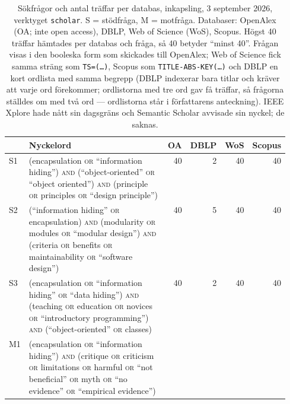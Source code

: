 \begin{table}[!htb]
  \centering
  \caption{Sökfrågor och antal träffar per databas, inkapsling,
    3 september 2026, verktyget \texttt{scholar}.  S = stödfråga, M =
    motfråga.  Databaser: OpenAlex (OA; inte
    \foreignlanguage{english}{open access}), DBLP, Web of Science (WoS),
    Scopus.  Högst 40 träffar hämtades per databas och fråga, så 40
    betyder \enquote{minst 40}.  Frågan visas i den booleska form som
    skickades till OpenAlex; Web of Science fick samma sträng som
    \texttt{TS=(\dots)}, Scopus som \texttt{TITLE-ABS-KEY(\dots)} och
    DBLP en kort ordlista med samma begrepp (DBLP indexerar bara titlar
    och kräver att varje ord förekommer; ordlistorna med tre ord gav få
    träffar, så frågorna ställdes om med två ord --- ordlistorna står i
    författarens anteckning).  IEEE Xplore hade nått sin
    dagsgräns och Semantic Scholar avvisade sin nyckel; de
    saknas.}
  \label{tab:sok-queries-C-klasser}
  \footnotesize
  \begin{tabular}{@{}lp{0.55\linewidth}rrrr@{}}
    \toprule
    & Nyckelord & OA & DBLP & WoS & Scopus \\
    \midrule
    S1 & (encapsulation \textsc{or} \enquote{information hiding}) \textsc{and} (\enquote{object-oriented} \textsc{or} \enquote{object oriented}) \textsc{and} (principle \textsc{or} principles \textsc{or} \enquote{design principle})
       & 40 & 2 & 40 & 40 \\
    S2 & (\enquote{information hiding} \textsc{or} encapsulation) \textsc{and} (modularity \textsc{or} modules \textsc{or} \enquote{modular design}) \textsc{and} (criteria \textsc{or} benefits \textsc{or} maintainability \textsc{or} \enquote{software design})
       & 40 & 5 & 40 & 40 \\
    S3 & (encapsulation \textsc{or} \enquote{information hiding} \textsc{or} \enquote{data hiding}) \textsc{and} (teaching \textsc{or} education \textsc{or} novices \textsc{or} \enquote{introductory programming}) \textsc{and} (\enquote{object-oriented} \textsc{or} classes)
       & 40 & 2 & 40 & 40 \\
    \midrule
    M1 & (encapsulation \textsc{or} \enquote{information hiding}) \textsc{and} (critique \textsc{or} criticism \textsc{or} limitations \textsc{or} harmful \textsc{or} \enquote{not beneficial} \textsc{or} myth \textsc{or} \enquote{no evidence} \textsc{or} \enquote{empirical evidence})

\end{tabular}
\end{table}
